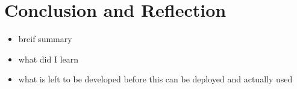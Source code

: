 
\chapter{Conclusion and Reflection}
\begin{itemize}
\item breif summary
\item what did I learn
\item what is left to be developed before this can be deployed and actually used
\end{itemize}
